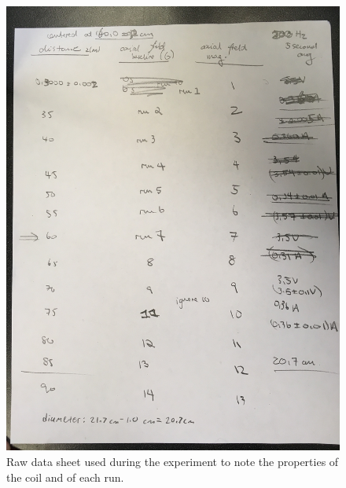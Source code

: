 \begin{figure}[H]
    \centering
    \includegraphics[width=0.5\linewidth]{figures/data_sheet.jpg}
    \caption{Raw data sheet used during the experiment to note the properties of the coil and of each run.}
\end{figure}